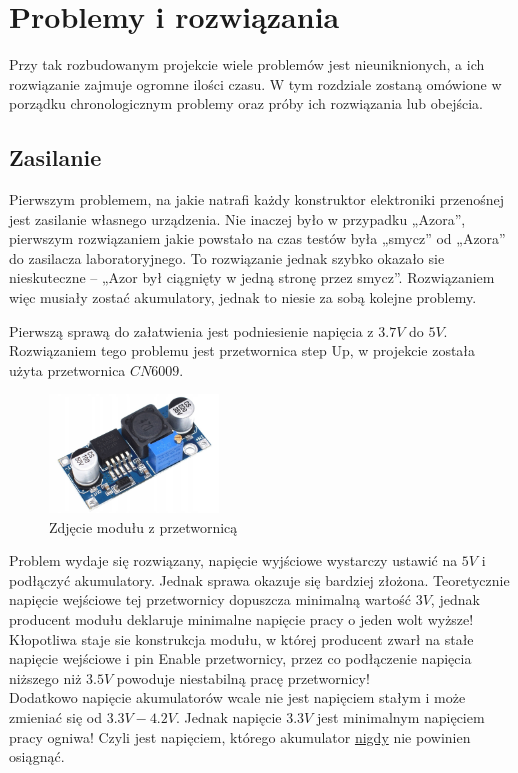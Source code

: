 \section{Problemy i rozwiązania}
    \tab Przy tak rozbudowanym projekcie wiele problemów jest nieuniknionych, a ich rozwiązanie zajmuje ogromne ilości czasu.
    W tym rozdziale zostaną omówione w porządku chronologicznym problemy oraz próby ich rozwiązania lub obejścia.

    \subsection{Zasilanie}
        \tab Pierwszym problemem, na jakie natrafi każdy konstruktor elektroniki przenośnej jest zasilanie własnego urządzenia.
        Nie inaczej było w przypadku „Azora”, pierwszym rozwiązaniem jakie powstało na czas testów była „smycz” od „Azora” do zasilacza laboratoryjnego.
        To rozwiązanie jednak szybko okazało sie nieskuteczne -- „Azor był ciągnięty w jedną stronę przez smycz”. 
        Rozwiązaniem więc musiały zostać akumulatory, jednak to niesie za sobą kolejne problemy.

        Pierwszą sprawą do załatwienia jest podniesienie napięcia z $3.7V$ do $5V$. 
        Rozwiązaniem tego problemu jest przetwornica step Up, w projekcie została użyta przetwornica $CN6009$.
        \begin{figure}[!ht]
            \centering
            \includegraphics[width = 0.4\textwidth]{Img/przetwornica.jpeg}
            \caption{Zdjęcie modułu z przetwornicą}
        \end{figure}

        \noindent
        Problem wydaje się rozwiązany, napięcie wyjściowe wystarczy ustawić na $5V$ i podłączyć akumulatory.
        Jednak sprawa okazuje się bardziej złożona. 
        Teoretycznie napięcie wejściowe tej przetwornicy dopuszcza minimalną wartość $3V$, jednak producent modułu deklaruje minimalne napięcie pracy o jeden wolt wyższe!
        Kłopotliwa staje sie konstrukcja modułu, w której producent zwarł na stałe napięcie wejściowe i pin Enable przetwornicy, przez co podłączenie napięcia niższego niż $3.5V$ powoduje niestabilną pracę przetwornicy!\\
        Dodatkowo napięcie akumulatorów wcale nie jest napięciem stałym i może zmieniać się od $3.3V - 4.2V$.
        Jednak napięcie $3.3V$ jest minimalnym napięciem pracy ogniwa! Czyli jest napięciem, którego akumulator \underline{nigdy} nie powinien osiągnąć.

